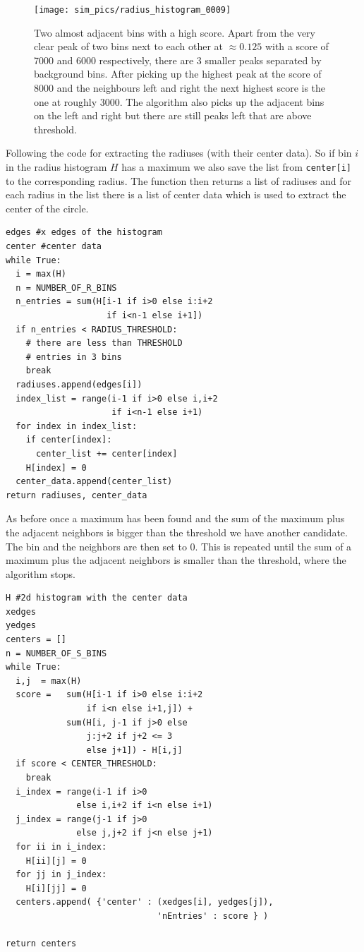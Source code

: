 \documentclass[11pt,twoside]{scrreprt}
\begin{document}
\begin{figure}[htb]
  \centering
  \texttt{[image: sim\_pics/radius\_histogram\_0009]}
  \caption[Histogram of duplicates]{Two almost adjacent bins with a high score\label{fig:2bins_highscore}. Apart from the very clear peak of two bins next to each
  other at $\approx 0.125$ with a score of 7000 and 6000 respectively, there are 3 smaller peaks separated by background bins. After picking
  up the highest peak at the score of 8000 and the neighbours left and right the next highest score is the one at roughly 3000. The algorithm
  also picks up the adjacent bins on the left and right but there are still peaks left that are above threshold.}
  \label{fig:bin_peak}
\end{figure}

Following the code for extracting the radiuses (with their center data). So if bin $i$ in the radius histogram $H$ has a maximum
we also save the list from \texttt{center[i]} to the corresponding radius. The function then returns a list of radiuses and for each
radius in the list there is a list of center data which is used to extract the center of the circle.
\begin{lstlisting}
edges #x edges of the histogram
center #center data
while True:
  i = max(H)
  n = NUMBER_OF_R_BINS
  n_entries = sum(H[i-1 if i>0 else i:i+2 
                    if i<n-1 else i+1])
  if n_entries < RADIUS_THRESHOLD:
    # there are less than THRESHOLD
    # entries in 3 bins
    break
  radiuses.append(edges[i])
  index_list = range(i-1 if i>0 else i,i+2 
                     if i<n-1 else i+1)
  for index in index_list:
    if center[index]:
      center_list += center[index]
    H[index] = 0
  center_data.append(center_list)    
return radiuses, center_data 
\end{lstlisting}
As before once a maximum has been found and the sum of the maximum plus the adjacent neighbors is bigger than the threshold we have another
candidate. The bin and the neighbors are then set to 0. This is repeated until the sum of a maximum plus the adjacent neighbors is smaller
than the threshold, where the algorithm stops.
\begin{lstlisting}
H #2d histogram with the center data
xedges 
yedges 
centers = []
n = NUMBER_OF_S_BINS
while True:
  i,j  = max(H)
  score =   sum(H[i-1 if i>0 else i:i+2 
                if i<n else i+1,j]) + 
            sum(H[i, j-1 if j>0 else
                j:j+2 if j+2 <= 3 
                else j+1]) - H[i,j]
  if score < CENTER_THRESHOLD:
    break
  i_index = range(i-1 if i>0 
              else i,i+2 if i<n else i+1)
  j_index = range(j-1 if j>0 
              else j,j+2 if j<n else j+1)
  for ii in i_index:
    H[ii][j] = 0  
  for jj in j_index:
    H[i][jj] = 0
  centers.append( {'center' : (xedges[i], yedges[j]), 
                              'nEntries' : score } )

return centers
\end{lstlisting}
\end{document}
